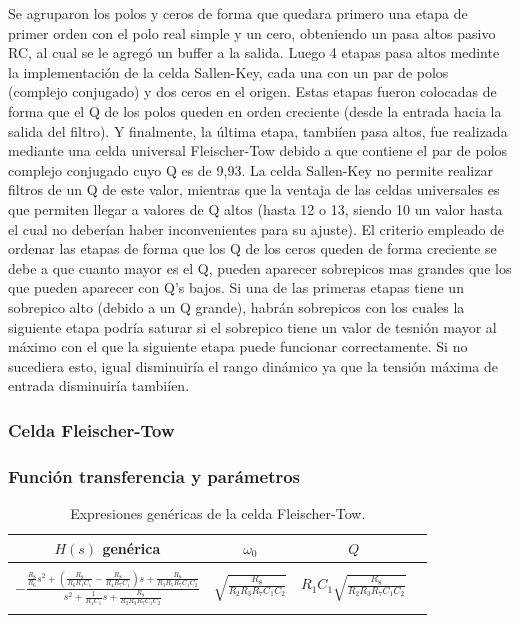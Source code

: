 Se agruparon los polos y ceros de forma que quedara primero una etapa de primer orden con el polo real simple y un cero, obteniendo un pasa altos pasivo RC, al cual se le agreg\'o un buffer a la salida. Luego 4 etapas pasa altos medinte la implementaci\'on de la celda Sallen-Key, cada una con un par de polos (complejo conjugado) y dos ceros en el origen. Estas etapas fueron colocadas de forma que el Q de los polos queden en orden creciente (desde la entrada hacia la salida del filtro). Y finalmente, la \'ultima etapa, tambi\'ien pasa altos, fue realizada mediante una celda universal Fleischer-Tow debido a que contiene el par de polos complejo conjugado cuyo Q es de 9,93. La celda Sallen-Key no permite realizar filtros de un Q de este valor, mientras que la ventaja de las celdas universales es que permiten llegar a valores de Q altos (hasta 12 o 13, siendo 10 un valor hasta el cual no deber\'ian haber inconvenientes para su ajuste). El criterio empleado de ordenar las etapas de forma que los Q de los ceros queden de forma creciente se debe a que cuanto mayor es el Q, pueden aparecer sobrepicos mas grandes que los que pueden aparecer con Q's bajos. Si una de las primeras etapas tiene un sobrepico alto (debido a un Q grande), habr\'an sobrepicos con los cuales la siguiente etapa podr\'ia saturar si el sobrepico tiene un valor de tesni\'on mayor al m\'aximo con el que la siguiente etapa puede funcionar correctamente. Si no sucediera esto, igual disminuir\'ia el rango din\'amico ya que la tensi\'on m\'axima de entrada disminuir\'ia tambi\'ien.

\subsubsection{Celda Fleischer-Tow}

\subsubsection{Funci\'on transferencia y par\'ametros}

\begin{table}[H] 
	\centering
	\begin{tabular}{c c c c}
		$H(s)$ gen\'erica & $\omega_0$ & $Q$\\
		\hline \\
		$- \frac{\frac{R_8}{R_6}s^2+\left(\frac{R_8}{R_6R_1C_1}-\frac{R_8}{R_4R_7C_1}\right)s+\frac{R_8}{R_3R_5R_7C_1C_2}}{s^2+\frac{1}{R_1C_1}s+\frac{R_8}{R_2R_3R_7C_1C_2}}$&$\sqrt{\frac{R_8}{R_2R_3R_7C_1C_2}}$&$R_1C_1\sqrt{\frac{R_8}{R_2R_3R_7C_1C_2}}$\\ \\
		\hline
	\end{tabular}
	\caption{Expresiones gen\'ericas de la celda Fleischer-Tow.}
	\label{f_generica}
\end{table}

